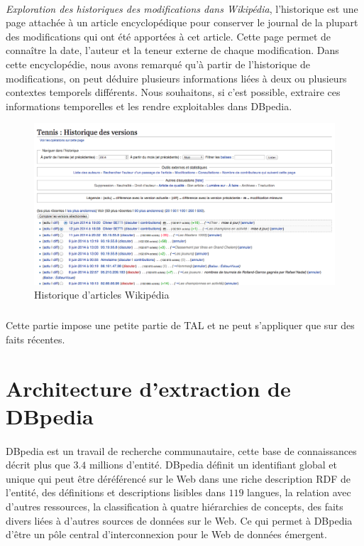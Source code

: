 \paragraph{}
{\it Exploration des historiques des modifications dans Wikipédia}, l'historique est une page attachée à un article encyclopédique pour conserver le journal de la plupart des modifications qui ont été apportées à cet article. Cette page permet de connaître la date, l'auteur et la teneur externe de chaque modification.
Dans cette encyclopédie, nous avons remarqué qu'à partir de l'historique de modifications, on peut déduire plusieurs informations liées à deux ou plusieurs contextes temporels différents.
Nous souhaitons, si c’est possible, extraire ces informations temporelles et les rendre exploitables dans DBpedia.
\begin{figure}[H]
\centering
\includegraphics[width=14cm]{NEWHISTORIQUE.png}
\caption{Historique d'articles Wikipédia}
\end{figure}
\subparagraph{}
Cette partie impose une petite partie de TAL et ne peut s'appliquer que sur des faits récentes.
\newpage
\section{Architecture d'extraction de DBpedia}
\paragraph{}
DBpedia est un travail de recherche communautaire, cette base de connaissances décrit plus que $3.4$ millions d'entité. DBpedia définit un identifiant global et unique qui peut être déréférencé sur le Web dans une riche description RDF de l'entité, des définitions et descriptions lisibles dans $119$ langues, la relation avec d'autres ressources, la classification à quatre hiérarchies de concepts, des faits divers liées à d'autres sources de données sur le Web. Ce qui permet à DBpedia d'être un pôle central d'interconnexion pour le Web de données émergent.   
